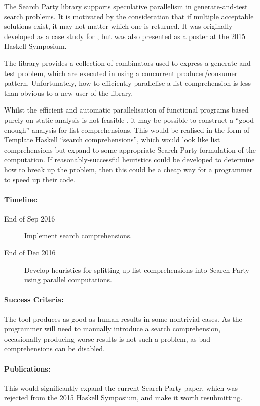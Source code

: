The Search Party library supports speculative parallelism in
generate-and-test search problems. It is motivated by the
consideration that if multiple acceptable solutions exist, it may not
matter which one is returned. It was originally developed as a case
study for \dejafu{}, but was also presented as a poster at the 2015
Haskell Symposium.

The library provides a collection of combinators used to express a
generate-and-test problem, which are executed in using a concurrent
producer/consumer pattern. Unfortunately, how to efficiently
parallelise a list comprehension is less than obvious to a new user of
the library.

Whilst the efficient and automatic parallelisation of functional
programs based purely on static analysis is not feasible
\citep{autopar}, it may be possible to construct a ``good enough''
analysis for list comprehensions. This would be realised in the form
of Template Haskell ``search comprehensions'', which would look like
list comprehensions but expand to some appropriate Search Party
formulation of the computation. If reasonably-successful heuristics
could be developed to determine how to break up the problem, then this
could be a cheap way for a programmer to speed up their code.

\paragraph{Timeline:}

\begin{description}
\item[End of Sep 2016] Implement search comprehensions.

\item[End of Dec 2016] Develop heuristics for splitting up list
  comprehensions into Search Party-using parallel computations.
\end{description}

\paragraph{Success Criteria:}

The tool produces as-good-as-human results in some nontrivial
cases. As the programmer will need to manually introduce a search
comprehension, occasionally producing worse results is not such a
problem, as bad comprehensions can be disabled.

\paragraph{Publications:}

This would significantly expand the current Search Party paper, which
was rejected from the 2015 Haskell Symposium, and make it worth
resubmitting.
